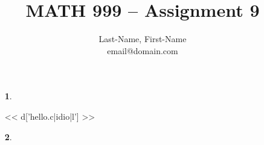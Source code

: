 \newcommand{\preamblefolder}{./include}       %

\usepackage[enable]{easy-todo}                %

\title{MATH 999 -- Assignment 9}
\author{
  Last-Name, First-Name\\
  {\selectfont email@domain.com}
}


  \maketitle

    \begin{enumerate}
      \item[\textbf{1}.]
      
        \aspace

<< d['hello.c|idio|l'] >>
      
      \qspace

      \item[\textbf{2}.]
      
        \aspace

      
      
    \end{enumerate}


  \begin{bibdiv}
    \begin{biblist}
    \end{biblist}
  \end{bibdiv}

  \listoftodos


